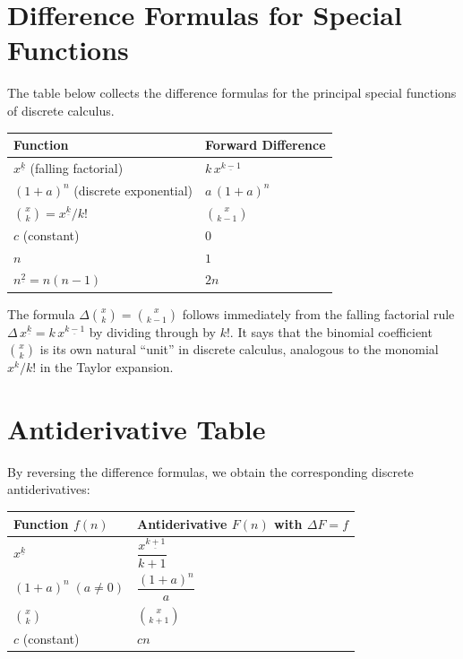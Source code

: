 
\section*{Difference Formulas for Special Functions}

The table below collects the difference formulas for the principal
special functions of discrete calculus.

\begin{remark*}
\renewcommand{\arraystretch}{1.7}
\begin{tabular}{@{}l l@{}}
\textbf{Function} & \textbf{Forward Difference} \\
\hline
$x^{\underline{k}}$ (falling factorial) & $k\,x^{\underline{k-1}}$ \\
$(1+a)^n$ (discrete exponential) & $a\,(1+a)^n$ \\
$\binom{x}{k} = x^{\underline{k}}/k!$ & $\binom{x}{k-1}$ \\
$c$ (constant) & $0$ \\
$n$ & $1$ \\
$n^{\underline{2}} = n(n-1)$ & $2n$ \\
\end{tabular}
\end{remark*}

\begin{remark*}
The formula \(\Delta\binom{x}{k} = \binom{x}{k-1}\) follows immediately
from the falling factorial rule \(\Delta\,x^{\underline{k}} = k\,x^{\underline{k-1}}\)
by dividing through by \(k!\). It says that the binomial coefficient
\(\binom{x}{k}\) is its own natural ``unit'' in discrete calculus, analogous
to the monomial \(x^k/k!\) in the Taylor expansion.
\end{remark*}

\section*{Antiderivative Table}

By reversing the difference formulas, we obtain the corresponding
discrete antiderivatives:

\begin{remark*}
\renewcommand{\arraystretch}{1.7}
\begin{tabular}{@{}l l@{}}
\textbf{Function \(f(n)\)} & \textbf{Antiderivative \(F(n)\) with \(\Delta F = f\)} \\
\hline
$x^{\underline{k}}$ & $\dfrac{x^{\underline{k+1}}}{k+1}$ \\[6pt]
$(1+a)^n\;(a\ne 0)$ & $\dfrac{(1+a)^n}{a}$ \\[6pt]
$\binom{x}{k}$ & $\binom{x}{k+1}$ \\[6pt]
$c$ (constant) & $cn$ \\
\end{tabular}
\end{remark*}

